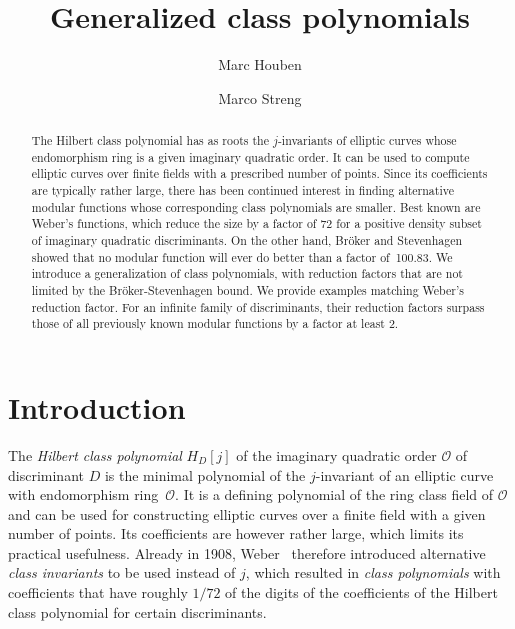 \documentclass{amsart}
\numberwithin{equation}{section}
\theoremstyle{definition}
\begin{document}
	
	\title{Generalized class polynomials}
	
	\author{Marc Houben}
	\address{Marc Houben. Departement Wiskunde, KU Leuven,
		Celestijnenlaan 200B -- bus 2400,
		3001 Leuven,
		Belgium\vspace{-0.25cm}}
	\address{imec-COSIC, KU Leuven, Kasteelpark Arenberg 10/2452, 3001 Leuven, Belgium \vspace{-0.25cm}}
	\address{Mathematisch Instituut, Universiteit Leiden,
		P.O.\ box 9512,
		2300 RA Leiden,
		The Netherlands}
	
	\author{Marco Streng}
	\address{Marco Streng. Mathematisch Instituut, Universiteit Leiden,
		P.O.\ box 9512,
		2300 RA Leiden,
		The Netherlands}
	
	\begin{abstract}
	
	The Hilbert class polynomial has as roots the $j$-invariants of elliptic curves
	whose endomorphism ring is a given imaginary quadratic order.
	It can be used to compute elliptic curves over finite fields
	with a prescribed number of points.
	Since its coefficients are typically rather large,
	there has been continued interest in finding alternative modular functions
	whose corresponding class polynomials are smaller.
	Best known are Weber's functions,
	which reduce the size by a factor of 72
	for a positive density subset of imaginary quadratic discriminants.
	On the other hand, Bröker and Stevenhagen showed that
	no modular function will ever do better
	than a factor of~100.83.
	We introduce a generalization of class polynomials,
	with reduction factors that are not limited by the Bröker-Stevenhagen bound.
	We provide examples matching Weber's reduction factor.
	For an infinite family of discriminants,
	their reduction factors surpass those of
	all previously known
	modular functions
	by a factor at least 2.
	\end{abstract}
	
	\maketitle
	
	
	\section{Introduction}
	
	The \emph{Hilbert class polynomial} $H_D[j]$
	of the imaginary quadratic order $\mathcal{O}$ of discriminant $D$
	is the minimal polynomial of the $j$-invariant
	of an elliptic curve with endomorphism ring~$\mathcal{O}$.
	It is a defining polynomial of the ring class field of $\mathcal{O}$
	and can be used for constructing elliptic curves over a finite field with a given number of points.
	Its coefficients are however rather large, which limits its practical usefulness.
	Already in 1908, Weber~\cite{weber3} therefore introduced alternative
	\emph{class invariants} to be used instead of $j$,
	which resulted in \emph{class polynomials}
	with coefficients that have roughly $1/72$ of the digits of the coefficients
	of the Hilbert class polynomial for certain discriminants.
	
\end{document}
